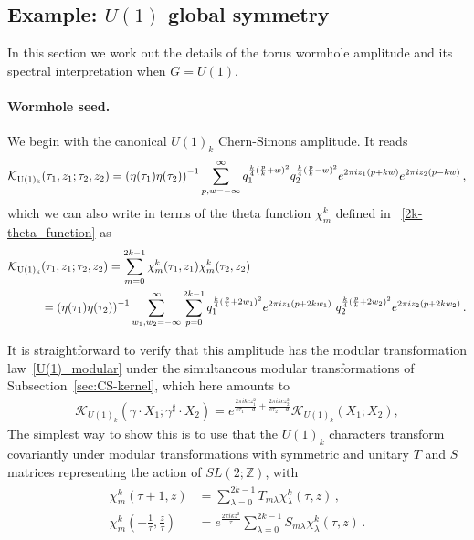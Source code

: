 \documentclass[11pt]{article}
\numberwithin{equation}{section}
\begin{document}
\subsection{Example: $U(1)$ global symmetry}
\label{sec:U1-holography}

In this section we work out the details of the torus wormhole amplitude and its spectral interpretation when $G=U(1)$. 

\paragraph{Wormhole seed.}
We begin with the canonical $U(1)_k$ Chern-Simons amplitude. It reads
\begin{align}
   \mathcal{K}_{\rm U(1)_k}(\tau_1,z_1;\tau_2,z_2)= \left(\eta(\tau_1)\eta(\tau_{2})\right)^{-1}\sum_{p,w=-\infty}^{\infty} q_1^{\frac{k}{4}(
\frac{p}{k}+w)^2}q_2^{\frac{k}{4}(\frac{p}{k}-w)^2} e^{2\pi i z_1(p+kw)}e^{2\pi i z_2(p-kw)}\,,
\label{U(1)_seed_2sum}
\end{align}
which we can also write in terms of the theta function $\chi_m^k$ defined in ~\eqref{2k-theta_function} as
\begin{align}
    \mathcal K_{\rm U(1)_k}&(\tau_1,z_1;\tau_2,z_2) =\sum_{m=0}^{2k-1}  \chi_m^k(\tau_1,z_1)  \chi_m^k(\tau_2,z_2) 
\label{U(1)_seed_3sum}
\\
    &=\left(\eta(\tau_1)\eta(\tau_{2})\right)^{-1}\sum_{w_1,w_2=-\infty}^{\infty}\sum_{p=0}^{2k-1} q_1^{\frac{k}{4}(\frac{p}{k}+2w_1)^2}e^{2\pi i z_1(p+2kw_1)}~ q_2^{\frac{k}{4}(\frac{p}{k}+2w_2)^2}e^{2\pi i z_2(p+2kw_2)}\,.
    \label{U(1)_seed_Wi}
\end{align}

It is straightforward to verify that this amplitude has the modular transformation law~\eqref{U(1)_modular} under the simultaneous modular transformations of Subsection~\ref{sec:CS-kernel}, which here amounts to
\begin{align}
       \mathcal{K}_{U(1)_k}\left(\gamma\cdot X_1;\gamma^{\sharp}\cdot X_2\right)=e^{ \frac{2\pi i k c z_1^2}{c\tau_1+d}+\frac{2\pi ik c z_2^2}{c\tau_2-d}} \mathcal{K}_{U(1)_k}(X_1;X_2),
       \label{equ:U(1)_simul_modular}
\end{align} 
The simplest way to show this is to use that the $U(1)_k$ characters transform covariantly under modular transformations with symmetric and unitary $T$ and $S$ matrices representing the action of $SL(2;\mathbb{Z})$, with
\begin{align}
\begin{split}
        \chi_{m}^k(\tau+1,z)&=\sum_{\lambda =0}^{2k-1} T_{m\lambda} \chi_{\lambda}^k(\tau,z)\,,
        \\
    \chi_{m}^k\left(-\frac{1}{\tau},\frac{z}{\tau}\right)&=e^{\frac{2\pi ikz^2}{\tau}}\sum_{\lambda =0}^{2k-1} S_{m\lambda} \chi_{\lambda}^k(\tau,z)\,.
\end{split}
\label{eq:U1_ST_matrix}
\end{align}
\end{document}
